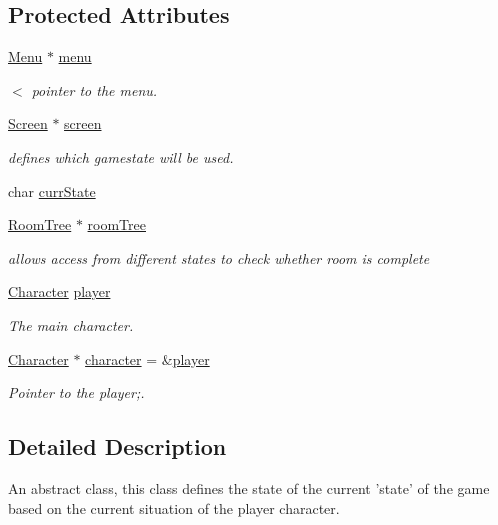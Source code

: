 \subsection*{Protected Attributes}
\begin{DoxyCompactItemize}
\item 
\hyperlink{classMenu}{Menu} $\ast$ \hyperlink{classGameState_aebc12d6e90edfbe51a571858f6288f93}{menu}
\begin{DoxyCompactList}\small\item\em $<$ pointer to the menu. \end{DoxyCompactList}\item 
\hyperlink{classScreen}{Screen} $\ast$ \hyperlink{classGameState_a877c0c626d54802e54e876a56dc6603b}{screen}
\begin{DoxyCompactList}\small\item\em defines which gamestate will be used. \end{DoxyCompactList}\item 
char \hyperlink{classGameState_a541915faaaac7068797345cce53deb9c}{curr\-State}
\item 
\hyperlink{classRoomTree}{Room\-Tree} $\ast$ \hyperlink{classGameState_acf694139ba8388f8258eeffdb75f0c3b}{room\-Tree}
\begin{DoxyCompactList}\small\item\em allows access from different states to check whether room is complete \end{DoxyCompactList}\item 
\hyperlink{classCharacter}{Character} \hyperlink{classGameState_a4a951449392cb8f339fe07a7b38e3cb5}{player}
\begin{DoxyCompactList}\small\item\em The main character. \end{DoxyCompactList}\item 
\hyperlink{classCharacter}{Character} $\ast$ \hyperlink{classGameState_a925d16440517e4133b4b720b4276be58}{character} = \&\hyperlink{classGameState_a4a951449392cb8f339fe07a7b38e3cb5}{player}
\begin{DoxyCompactList}\small\item\em Pointer to the player;. \end{DoxyCompactList}\end{DoxyCompactItemize}


\subsection{Detailed Description}
An abstract class, this class defines the state of the current 'state' of the game based on the current situation of the player character. 

